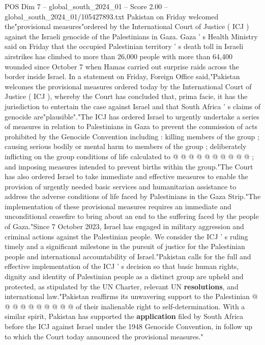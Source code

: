 \begin{textsample}{POS Dim 7 – global\_south\_2024\_01 – Score 2.00 – global\_south\_2024\_01/105427893.txt}  \label{ex:f7_pos_047}
Pakistan on Friday welcomed the"provisional measures"ordered by the International Court of Justice ( ICJ ) against the Israeli genocide of the Palestinians in Gaza.
Gaza ' s Health Ministry said on Friday that the occupied Palestinian territory ' s death toll in Israeli airstrikes has climbed to more than 26,000 people with more than 64,400 wounded since October 7 when Hamas carried out surprise raids across the border inside Israel.
In a statement on Friday, Foreign Office said,"Pakistan welcomes the provisional measures ordered today by the International Court of Justice ( ICJ ), whereby the Court has concluded that, prima facie, it has the jurisdiction to entertain the case against Israel and that South Africa ' s claims of genocide are"plausible"."The ICJ has ordered Israel to urgently undertake a series of measures in relation to Palestinians in Gaza to prevent the commission of acts prohibited by the Genocide Convention including : killing members of the group ; causing serious bodily or mental harm to members of the group ; deliberately inflicting on the group conditions of life calculated to @ @ @ @ @ @ @ @ @ @ ; and imposing measures intended to prevent births within the group."The Court has also ordered Israel to take immediate and effective measures to enable the provision of urgently needed basic services and humanitarian assistance to address the adverse conditions of life faced by Palestinians in the Gaza Strip."The implementation of these provisional measures requires an immediate and unconditional ceasefire to bring about an end to the suffering faced by the people of Gaza."Since 7 October 2023, Israel has engaged in military aggression and criminal actions against the Palestinian people.
We consider the ICJ ' s ruling timely and a significant milestone in the pursuit of justice for the Palestinian people and international accountability of Israel."Pakistan calls for the full and effective implementation of the ICJ ' s decision so that basic human rights, dignity and identity of Palestinian people as a distinct group are upheld and protected, as stipulated by the UN Charter, relevant UN \textbf{resolutions}, and international law."Pakistan reaffirms its unwavering support to the Palestinian @ @ @ @ @ @ @ @ @ @ of their inalienable right to self-determination.
With a similar spirit, Pakistan has supported the \textbf{application} filed by South Africa before the ICJ against Israel under the 1948 Genocide Convention, in follow up to which the Court today announced the provisional measures."

\end{textsample}
